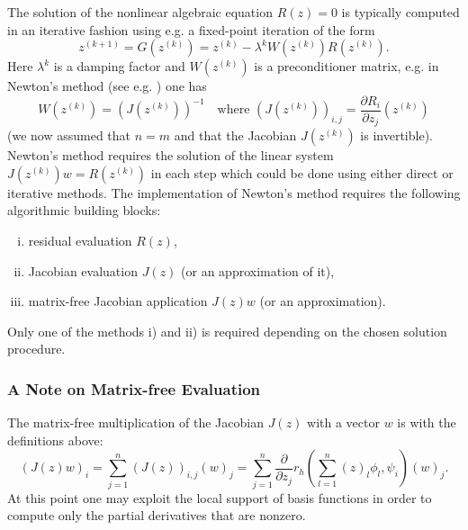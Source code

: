 \documentclass[a4paper,12pt]{article}
\begin{document}
The solution of the nonlinear algebraic equation $R(z)=0$ is typically computed
in an iterative fashion using e.g. a fixed-point iteration of the form
\begin{equation}
z^{(k+1)} = G(z^{(k)}) = z^{(k)} - \lambda^{k} W(z^{(k)}) R(z^{(k)}) .
\end{equation}
Here $\lambda^{k}$ is a damping factor
and $W(z^{(k)})$ is a preconditioner matrix, e.g. in Newton's method (see e.g. \cite{Braess}) one
has
\begin{equation*}
W(z^{(k)}) = (J(z^{(k)}))^{-1} \quad \text{where $(J(z^{(k)}))_{i,j} = \frac{\partial R_i}{\partial z_j}
(z^{(k)})$}
\end{equation*}
(we now assumed that $n=m$ and that the Jacobian $J(z^{(k)})$ is invertible).
Newton's method requires the solution of the linear system $J(z^{(k)}) w = R(z^{(k)})$ in each
step which could be done using either direct or iterative methods.
The implementation of  Newton's method requires the following
algorithmic building blocks:
\begin{enumerate}[i)]
\item residual evaluation $R(z)$,
\item Jacobian evaluation $J(z)$ (or an approximation of it),
\item matrix-free Jacobian application $J(z) w$ (or an approximation).
\end{enumerate}
Only one of the methods i) and ii) is required depending on the chosen
solution procedure.

\subsubsection*{A Note on Matrix-free Evaluation}

The matrix-free multiplication of the Jacobian $J(z)$ with a vector $w$ is with
the definitions above:
\begin{equation*}
(J(z) w)_i = \sum_{j=1}^n (J(z))_{i,j} (w)_j = \sum_{j=1}^n
\frac{\partial}{\partial z_j} r_h\left(\sum_{l=1}^n (z)_l  \phi_l,\psi_i\right) (w)_j .
\end{equation*}
At this point one may exploit the local support of basis functions in order
to compute only the partial derivatives that are nonzero.
\end{document}
